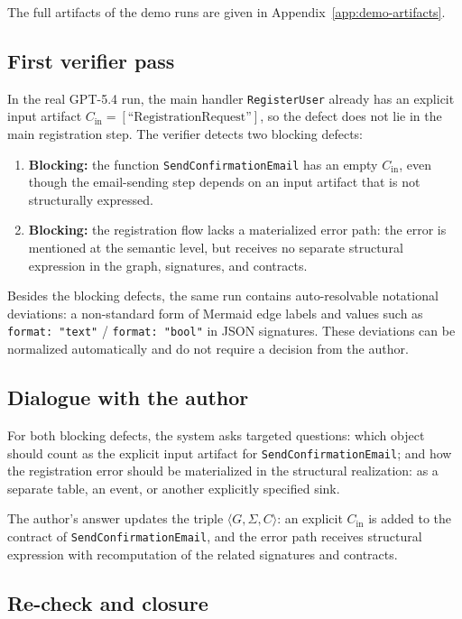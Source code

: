 \documentclass[12pt,a4paper]{article}
\begin{document}
The full artifacts of the demo runs are given in Appendix~\ref{app:demo-artifacts}.

\subsection{First verifier pass}

In the real GPT-5.4 run, the main handler \texttt{RegisterUser} already has an explicit input artifact $C_{\mathrm{in}} = [\text{``RegistrationRequest''}]$, so the defect does not lie in the main registration step. The verifier detects two blocking defects:

\begin{enumerate}
\item \textbf{Blocking:} the function \texttt{SendConfirmationEmail} has an empty $C_{\mathrm{in}}$, even though the email-sending step depends on an input artifact that is not structurally expressed.
\item \textbf{Blocking:} the registration flow lacks a materialized error path: the error is mentioned at the semantic level, but receives no separate structural expression in the graph, signatures, and contracts.
\end{enumerate}

Besides the blocking defects, the same run contains auto-resolvable notational deviations: a non-standard form of Mermaid edge labels and values such as \texttt{format: "text"} / \texttt{format: "bool"} in JSON signatures. These deviations can be normalized automatically and do not require a decision from the author.

\subsection{Dialogue with the author}

For both blocking defects, the system asks targeted questions: which object should count as the explicit input artifact for \texttt{SendConfirmationEmail}; and how the registration error should be materialized in the structural realization: as a separate table, an event, or another explicitly specified sink.

The author's answer updates the triple $\langle G, \Sigma, C \rangle$: an explicit $C_{\mathrm{in}}$ is added to the contract of \texttt{SendConfirmationEmail}, and the error path receives structural expression with recomputation of the related signatures and contracts.

\subsection{Re-check and closure}
\end{document}
